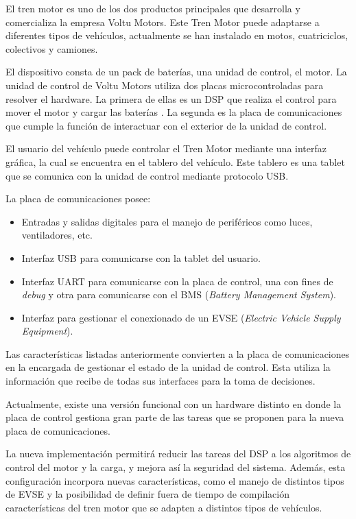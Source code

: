 \documentclass[
11pt, %
codirector, %
]{charter}
\begin{document}
El tren motor es uno de los dos productos principales que desarrolla y comercializa la empresa Voltu Motors. Este Tren Motor puede adaptarse a diferentes tipos de vehículos, actualmente se han instalado en motos, cuatriciclos, colectivos y camiones.

El dispositivo consta de un pack de baterías, una unidad de control, el motor. La unidad de control de Voltu Motors utiliza dos placas microcontroladas para resolver el hardware.
La primera de ellas es un DSP que realiza el control para mover el motor y cargar las baterías . La segunda es la placa de comunicaciones que cumple la función de interactuar con el exterior de la unidad de control.

El usuario del vehículo puede controlar el Tren Motor mediante una interfaz gráfica, la cual se encuentra en el tablero del vehículo. Este tablero es una tablet que se comunica con la unidad de control mediante protocolo USB.

La placa de comunicaciones posee:

\begin{itemize}
	\item Entradas y salidas digitales para el manejo de periféricos como luces, ventiladores, etc.
	\item Interfaz USB para comunicarse con la tablet del usuario.
	\item Interfaz UART para comunicarse con la placa de control, una con fines de \textit{debug} y otra para comunicarse con el BMS (\textit{Battery Management System}).
	\item Interfaz para gestionar el conexionado de un EVSE (\textit{Electric Vehicle Supply Equipment}).
\end{itemize}

Las características listadas anteriormente convierten a la placa de comunicaciones en la encargada de gestionar el estado de la unidad de control. Esta utiliza la información que recibe de todas sus interfaces para la toma de decisiones.

Actualmente, existe una versión funcional con un hardware distinto en donde la placa de control gestiona gran parte de las tareas que se proponen para la nueva placa de comunicaciones.

La nueva implementación permitirá reducir las tareas del DSP a los algoritmos de control del motor y la carga, y mejora así la seguridad del sistema. Además, esta configuración incorpora nuevas características, como el manejo de distintos tipos de EVSE y la posibilidad de definir fuera de tiempo de compilación características del tren motor que se adapten a distintos tipos de vehículos.
\end{document}
